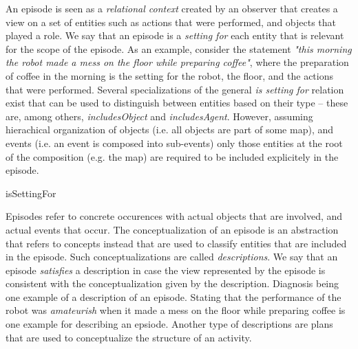 An episode is seen as a \emph{relational context} created by an observer that creates a view on a set of entities such as actions that were performed, and objects that played a role. We say that an episode is a \emph{setting for} each entity that is relevant for the scope of the episode. As an example, consider the statement \emph{"this morning the robot made a mess on the floor while preparing coffee"}, where the preparation of coffee in the morning is the setting for the robot, the floor, and the actions that were performed.
Several specializations of the general \emph{is setting for} relation exist that can be used to distinguish between entities based on their type -- these are, among others, \emph{includesObject} and \emph{includesAgent}.
However, assuming hierachical organization of objects (i.e. all objects are part of some map), and events (i.e. an event is composed into sub-events) only those entities at the root of the composition (e.g. the map) are required to be included explicitely in the episode.

\begin{ODP}{isSettingFor}
\end{ODP}

Episodes refer to concrete occurences with actual objects that are involved, and actual events that occur.
The conceptualization of an episode is an abstraction that refers to concepts instead that are used to classify entities that are included in the episode.
Such conceptualizations are called \emph{descriptions}.
We say that an episode \emph{satisfies} a description in case the view represented
by the episode is consistent with the conceptualization given by the description.
Diagnosis being one example of a description of an episode.
Stating that the performance of the robot was \emph{amateurish} when it made a mess on the floor while
preparing coffee is one example for describing an epsiode.
Another type of descriptions are plans that are used to conceptualize the structure of an activity.

